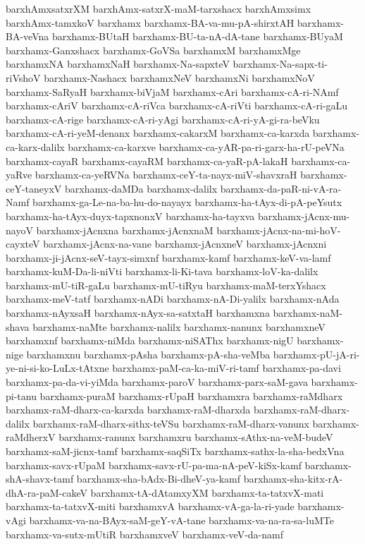 {barxhAmxsatxrXM
barxhAmx-satxrX-maM-tarxshacx
barxhAmxsimx
barxhAmx-tamxkoV
barxhamx
barxhamx-BA-va-mu-pA-shirxtAH
barxhamx-BA-veVna
barxhamx-BUtaH
barxhamx-BU-ta-nA-dA-tane
barxhamx-BUyaM
barxhamx-Ganxshacx
barxhamx-GoVSa
barxhamxM
barxhamxMge
barxhamxNA
barxhamxNaH
barxhamx-Na-sapxteV
barxhamx-Na-sapx-ti-riVshoV
barxhamx-Nashacx
barxhamxNeV
barxhamxNi
barxhamxNoV
barxhamx-SaRyaH
barxhamx-biVjaM
barxhamx-cAri
barxhamx-cA-ri-NAmf
barxhamx-cAriV
barxhamx-cA-riVca
barxhamx-cA-riVti
barxhamx-cA-ri-gaLu
barxhamx-cA-rige
barxhamx-cA-ri-yAgi
barxhamx-cA-ri-yA-gi-ra-beVku
barxhamx-cA-ri-yeM-denanx
barxhamx-cakarxM
barxhamx-ca-karxda
barxhamx-ca-karx-dalilx
barxhamx-ca-karxve
barxhamx-ca-yAR-pa-ri-garx-ha-rU-peVNa
barxhamx-cayaR
barxhamx-cayaRM
barxhamx-ca-yaR-pA-lakaH
barxhamx-ca-yaRve
barxhamx-ca-yeRVNa
barxhamx-ceY-ta-nayx-miV-shavxraH
barxhamx-ceY-taneyxV
barxhamx-daMDa
barxhamx-dalilx
barxhamx-da-paR-ni-vA-ra-Namf
barxhamx-ga-Le-na-ba-hu-do-nayayx
barxhamx-ha-tAyx-di-pA-peYsutx
barxhamx-ha-tAyx-duyx-tapxnonxV
barxhamx-ha-tayxva
barxhamx-jAcnx-mu-nayoV
barxhamx-jAcnxna
barxhamx-jAcnxnaM
barxhamx-jAcnx-na-mi-hoV-cayxteV
barxhamx-jAcnx-na-vane
barxhamx-jAcnxneV
barxhamx-jAcnxni
barxhamx-ji-jAcnx-seV-tayx-simxnf
barxhamx-kamf
barxhamx-keV-va-lamf
barxhamx-kuM-Da-li-niVti
barxhamx-li-Ki-tava
barxhamx-loV-ka-dalilx
barxhamx-mU-tiR-gaLu
barxhamx-mU-tiRyu
barxhamx-maM-terxYshacx
barxhamx-meV-tatf
barxhamx-nADi
barxhamx-nA-Di-yalilx
barxhamx-nAda
barxhamx-nAyxsaH
barxhamx-nAyx-sa-satxtaH
barxhamxna
barxhamx-naM-shava
barxhamx-naMte
barxhamx-nalilx
barxhamx-nanunx
barxhamxneV
barxhamxnf
barxhamx-niMda
barxhamx-niSAThx
barxhamx-nigU
barxhamx-nige
barxhamxnu
barxhamx-pAsha
barxhamx-pA-sha-veMba
barxhamx-pU-jA-ri-ye-ni-si-ko-LuLx-tAtxne
barxhamx-paM-ca-ka-miV-ri-tamf
barxhamx-pa-davi
barxhamx-pa-da-vi-yiMda
barxhamx-paroV
barxhamx-parx-saM-gava
barxhamx-pi-tanu
barxhamx-puraM
barxhamx-rUpaH
barxhamxra
barxhamx-raMdharx
barxhamx-raM-dharx-ca-karxda
barxhamx-raM-dharxda
barxhamx-raM-dharx-dalilx
barxhamx-raM-dharx-sithx-teVSu
barxhamx-raM-dharx-vanunx
barxhamx-raMdherxV
barxhamx-ranunx
barxhamxru
barxhamx-sAthx-na-veM-budeV
barxhamx-saM-jicnx-tamf
barxhamx-saqSiTx
barxhamx-sathx-la-sha-bedxVna
barxhamx-savx-rUpaM
barxhamx-savx-rU-pa-ma-nA-peV-kiSx-kamf
barxhamx-shA-shavx-tamf
barxhamx-sha-bAdx-Bi-dheV-ya-kamf
barxhamx-sha-kitx-rA-dhA-ra-paM-cakeV
barxhamx-tA-dAtamxyXM
barxhamx-ta-tatxvX-mati
barxhamx-ta-tatxvX-miti
barxhamxvA
barxhamx-vA-ga-la-ri-yade
barxhamx-vAgi
barxhamx-va-na-BAyx-saM-geY-vA-tane
barxhamx-va-na-ra-sa-luMTe
barxhamx-va-sutx-mUtiR
barxhamxveV
barxhamx-veV-da-namf
}
